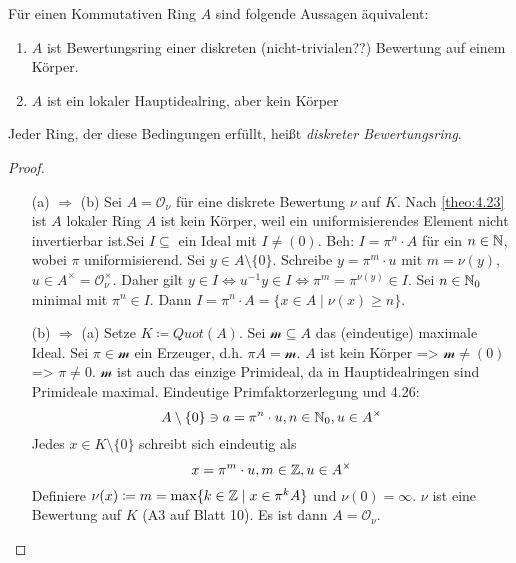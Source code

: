 \documentclass[../main.tex]{subfiles}
\begin{document}
\begin{theorem}%
    Für einen Kommutativen Ring $A$ sind folgende Aussagen äquivalent:
    \begin{enumerate}[label=(\alph*)]
        \item $A$ ist Bewertungsring einer diskreten (nicht-trivialen??) Bewertung auf einem Körper.
        \item $A$ ist ein lokaler Hauptidealring, aber kein Körper
    \end{enumerate}
    Jeder Ring, der diese Bedingungen erfüllt, heißt \emph{diskreter Bewertungsring}.
\end{theorem}
\begin{proof} $ $
    \begin{itemize}
        \item[(a) $\Rightarrow$ (b)]
        Sei $A=\mathcal{O}_\nu$ für eine diskrete Bewertung $\nu$ auf $K$.
        Nach \ref{theo:4.23} ist $A$ lokaler Ring
        $A$ ist kein Körper, weil ein uniformisierendes Element nicht invertierbar ist.
        Sei $I\subseteq$ ein Ideal mit $I\neq (0)$.
        Beh: $I=\pi^n\cdot A$ für ein $n\in \mathbb{N}$, wobei $\pi$ uniformisierend.
        Sei $y\in A\setminus\{0\}$. Schreibe $y=\pi^m\cdot u$ mit $m=\nu(y)$, $u\in A^\times = \mathcal{O}_\nu^\times$.
        Daher gilt $y\in I\Leftrightarrow u^{-1}y\in I \Leftrightarrow \pi^m = \pi^{\nu(y)}\in I$.
        Sei $n\in \mathbb{N}_0$ minimal mit $\pi^n\in I$.
        Dann $I = \pi^n\cdot A = \{x\in A\mid \nu(x)\geq n\}$.
        
        \item[(b) $\Rightarrow$ (a)]
        Setze $K\coloneqq Quot(A)$. Sei $\mathcal{m}\subseteq A$ das (eindeutige) maximale Ideal.
        Sei $\pi\in \mathcal{m}$ ein Erzeuger, d.h. $\pi A = \mathcal{m}$.
        $A$ ist kein Körper => $\mathcal{m}\neq (0)$ => $\pi\neq 0$.
        $\mathcal{m}$ ist auch das einzige Primideal, da in Hauptidealringen sind Primideale maximal.
        Eindeutige Primfaktorzerlegung und 4.26:
        $$A\setminus\{0\} \ni a = \pi^n\cdot u, n\in \mathbb{N}_0, u\in A^\times$$
        Jedes $x\in K\setminus\{0\}$ schreibt sich eindeutig als
        $$x = \pi^m\cdot u,m\in \mathbb{Z}, u\in A^\times$$
        Definiere $\nu(x)\coloneqq m = \max \{k\in \mathbb{Z}\mid x\in \pi^kA\}$ und $\nu(0) = \infty$.
        $\nu$ ist eine Bewertung auf $K$ (A3 auf Blatt 10).
        Es ist dann $A=\mathcal{O}_\nu$.
    \end{itemize}
    
\end{proof}
\end{document}

